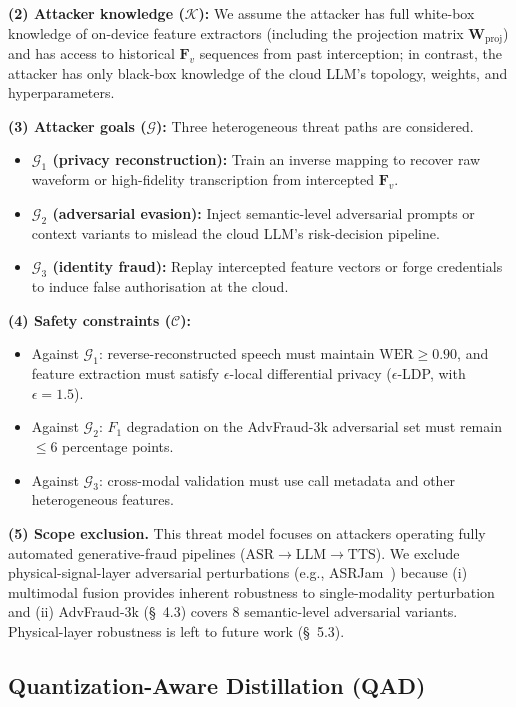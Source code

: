 \documentclass[11pt, a4paper]{article}
\begin{document}
\textbf{(2) Attacker knowledge ($\mathcal{K}$):} We assume the attacker has full white-box knowledge of on-device feature extractors (including the projection matrix $\bm{W}_{\mathrm{proj}}$) and has access to historical $\bm{F}_v$ sequences from past interception; in contrast, the attacker has only black-box knowledge of the cloud LLM's topology, weights, and hyperparameters.

\textbf{(3) Attacker goals ($\mathcal{G}$):} Three heterogeneous threat paths are considered.
\begin{itemize}
    \item \textbf{$\mathcal{G}_1$ (privacy reconstruction):} Train an inverse mapping to recover raw waveform or high-fidelity transcription from intercepted $\bm{F}_v$.
    \item \textbf{$\mathcal{G}_2$ (adversarial evasion):} Inject semantic-level adversarial prompts or context variants to mislead the cloud LLM's risk-decision pipeline.
    \item \textbf{$\mathcal{G}_3$ (identity fraud):} Replay intercepted feature vectors or forge credentials to induce false authorisation at the cloud.
\end{itemize}

\textbf{(4) Safety constraints ($\mathcal{C}$):}
\begin{itemize}
    \item Against $\mathcal{G}_1$: reverse-reconstructed speech must maintain $\text{WER}\ge 0.90$, and feature extraction must satisfy $\epsilon$-local differential privacy ($\epsilon$-LDP, with $\epsilon = 1.5$).
    \item Against $\mathcal{G}_2$: $F_1$ degradation on the AdvFraud-3k adversarial set must remain $\le 6$ percentage points.
    \item Against $\mathcal{G}_3$: cross-modal validation must use call metadata and other heterogeneous features.
\end{itemize}

\textbf{(5) Scope exclusion.} This threat model focuses on attackers operating fully automated generative-fraud pipelines ($\text{ASR}\!\rightarrow\!\text{LLM}\!\rightarrow\!\text{TTS}$). We exclude physical-signal-layer adversarial perturbations (e.g., ASRJam~\cite{19}) because (i) multimodal fusion provides inherent robustness to single-modality perturbation and (ii) AdvFraud-3k (\S~4.3) covers 8 semantic-level adversarial variants. Physical-layer robustness is left to future work (\S~5.3).

\subsection{Quantization-Aware Distillation (QAD)}
\end{document}

